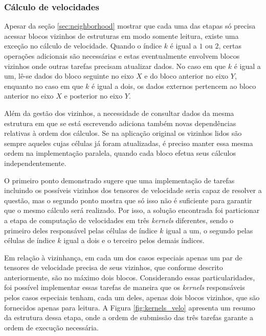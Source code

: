 \documentclass[cic,tc]{iiufrgs}
\begin{document}
\subsubsection{Cálculo de velocidades}

Apesar da seção \ref{sec:neighborhood} mostrar que cada uma das etapas só precisa acessar blocos vizinhos de estruturas em modo somente leitura, existe
uma exceção no cálculo de velocidade. Quando o índice $k$ é igual a $1$ ou $2$, certas operações adicionais são necessárias e estas
eventualmente envolvem blocos vizinhos onde outras tarefas precisam atualizar dados. No caso em que $k$ é igual a um, lê-se dados
do bloco seguinte no eixo $X$ e do bloco anterior no eixo $Y$, enquanto no caso em que $k$ é igual a dois, os dados externos pertencem
ao bloco anterior no eixo $X$ e posterior no eixo $Y$. 

Além da gestão dos vizinhos, a necessidade de consultar dados da mesma estrutura em que se está escrevendo adiciona também novas
dependências relativas à ordem dos cálculos. Se na aplicação original os vizinhos lidos são sempre aqueles cujas células já
foram atualizadas, é preciso manter essa mesma ordem na implementação paralela, quando cada bloco efetua seus cálculos independentemente.

O primeiro ponto demonstrado sugere que uma implementação de tarefas incluindo os possíveis vizinhos dos tensores de velocidade
seria capaz de resolver a questão, mas o segundo ponto mostra que só isso não é suficiente para garantir que o mesmo cálculo será
realizado. Por isso, a solução encontrada foi particionar a etapa de computação de velocidades em três \textit{kernels} diferentes, sendo
o primeiro deles responsável pelas células de índice $k$ igual a um, o segundo pelas células de índice $k$ igual a dois e o terceiro pelos
demais índices.

Em relação à vizinhança, em cada um dos casos especiais apenas um par de tensores de velocidade precisa de seus vizinhos, que conforme
descrito anteriormente, são no máximo dois blocos. Considerando essas particularidades, foi possível implementar essas tarefas de
maneira que os \textit{kernels} responsáveis pelos casos especiais tenham, cada um deles, apenas dois blocos vizinhos, que são fornecidos
apenas para leitura. A Figura \ref{fig:kernels_velo} apresenta um resumo da estrutura dessa etapa, onde a ordem de submissão das três
tarefas garante a ordem de execução necessária.
\end{document}
